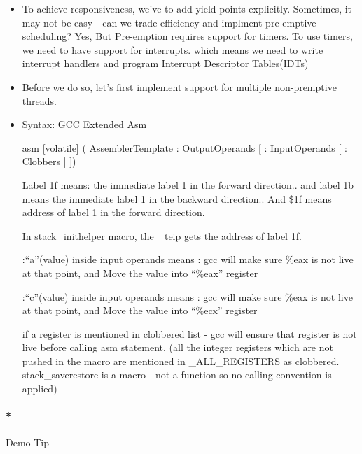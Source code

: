 \documentclass[]{article}
\newenvironment{Shaded}{}{}
\newcommand{\NormalTok}[1]{{#1}}
\let\oldparagraph\paragraph
\renewcommand{\paragraph}[1]{\oldparagraph{#1}\mbox{}}
\begin{document}
\begin{itemize}
\item
  To achieve responsiveness, we've to add yield points explicitly.
  Sometimes, it may not be easy - can we trade efficiency and implment
  pre-emptive scheduling? Yes, But Pre-emption requires support for
  timers. To use timers, we need to have support for interrupts. which
  means we need to write interrupt handlers and program Interrupt
  Descriptor Tables(IDTs)
\item
  Before we do so, let's first implement support for multiple
  non-premptive threads.
\item
  Syntax:
  \href{https://gcc.gnu.org/onlinedocs/gcc/Extended-Asm.html}{GCC
  Extended Asm}

\begin{Shaded}
\begin{Highlighting}[]
 \NormalTok{asm [volatile] ( AssemblerTemplate}
                  \NormalTok{: OutputOperands}
                  \NormalTok{[ : InputOperands}
                  \NormalTok{[ : Clobbers ] ])}
\end{Highlighting}
\end{Shaded}

  Label 1f means: the immediate label 1 in the forward direction.. and
  label 1b means the immediate label 1 in the backward direction.. And
  \$1f means address of label 1 in the forward direction.

  In stack\_inithelper macro, the \_teip gets the address of label 1f.

  :``a''(value) inside input operands means : gcc will make sure \%eax
  is not live at that point, and Move the value into ``\%eax'' register

  :``c''(value) inside input operands means : gcc will make sure \%eax
  is not live at that point, and Move the value into ``\%ecx'' register

  if a register is mentioned in clobbered list - gcc will ensure that
  register is not live before calling asm statement. (all the integer
  registers which are not pushed in the macro are mentioned in
  \_ALL\_REGISTERS as clobbered. stack\_saverestore is a macro - not a
  function so no calling convention is applied)
\end{itemize}

\paragraph*{Demo Tip}\label{demo-tip-4}
\end{document}
